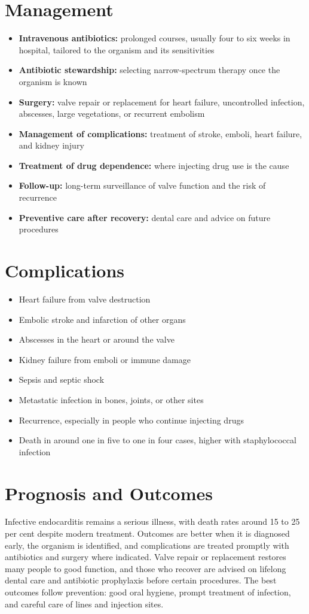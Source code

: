 \section*{Management}
\begin{itemize}
    \item \textbf{Intravenous antibiotics:} prolonged courses, usually four to six weeks in hospital, tailored to the organism and its sensitivities
    \item \textbf{Antibiotic stewardship:} selecting narrow-spectrum therapy once the organism is known
    \item \textbf{Surgery:} valve repair or replacement for heart failure, uncontrolled infection, abscesses, large vegetations, or recurrent embolism
    \item \textbf{Management of complications:} treatment of stroke, emboli, heart failure, and kidney injury
    \item \textbf{Treatment of drug dependence:} where injecting drug use is the cause
    \item \textbf{Follow-up:} long-term surveillance of valve function and the risk of recurrence
    \item \textbf{Preventive care after recovery:} dental care and advice on future procedures
\end{itemize}

\section*{Complications}
\begin{itemize}
    \item Heart failure from valve destruction
    \item Embolic stroke and infarction of other organs
    \item Abscesses in the heart or around the valve
    \item Kidney failure from emboli or immune damage
    \item Sepsis and septic shock
    \item Metastatic infection in bones, joints, or other sites
    \item Recurrence, especially in people who continue injecting drugs
    \item Death in around one in five to one in four cases, higher with staphylococcal infection
\end{itemize}

\section*{Prognosis and Outcomes}
Infective endocarditis remains a serious illness, with death rates around 15 to 25 per cent despite modern treatment. Outcomes are better when it is diagnosed early, the organism is identified, and complications are treated promptly with antibiotics and surgery where indicated. Valve repair or replacement restores many people to good function, and those who recover are advised on lifelong dental care and antibiotic prophylaxis before certain procedures. The best outcomes follow prevention: good oral hygiene, prompt treatment of infection, and careful care of lines and injection sites.

